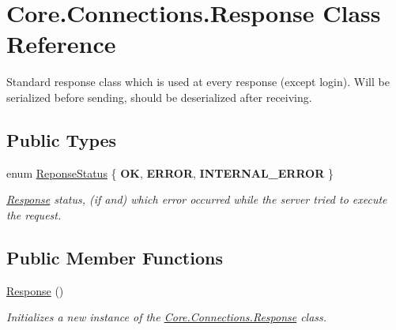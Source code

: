 \hypertarget{classCore_1_1Connections_1_1Response}{}\section{Core.\+Connections.\+Response Class Reference}
\label{classCore_1_1Connections_1_1Response}


Standard response class which is used at every response (except login). Will be serialized before sending, should be deserialized after receiving.  


\subsection*{Public Types}
\begin{DoxyCompactItemize}
\item 
enum \hyperlink{classCore_1_1Connections_1_1Response_a87c0ec7f5f782b30edebe2098acabab0}{Reponse\+Status} \{ {\bfseries O\+K}, 
{\bfseries E\+R\+R\+O\+R}, 
{\bfseries I\+N\+T\+E\+R\+N\+A\+L\+\_\+\+E\+R\+R\+O\+R}
 \}\begin{DoxyCompactList}\small\item\em \hyperlink{classCore_1_1Connections_1_1Response}{Response} status, (if and) which error occurred while the server tried to execute the request. \end{DoxyCompactList}
\end{DoxyCompactItemize}
\subsection*{Public Member Functions}
\begin{DoxyCompactItemize}
\item 
\hyperlink{classCore_1_1Connections_1_1Response_a5b36846768c756a8c6aa045024ac834a}{Response} ()
\begin{DoxyCompactList}\small\item\em Initializes a new instance of the \hyperlink{classCore_1_1Connections_1_1Response}{Core.\+Connections.\+Response} class. \end{DoxyCompactList}\end{DoxyCompactItemize}
